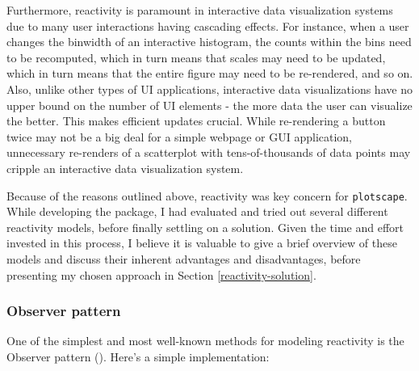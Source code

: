 \documentclass[
  openany]{book}
\theoremstyle{definition}
\theoremstyle{definition}
\theoremstyle{definition}
\theoremstyle{definition}
\theoremstyle{remark}
\begin{document}
Furthermore, reactivity is paramount in interactive data visualization systems due to many user interactions having cascading effects. For instance, when a user changes the binwidth of an interactive histogram, the counts within the bins need to be recomputed, which in turn means that scales may need to be updated, which in turn means that the entire figure may need to be re-rendered, and so on. Also, unlike other types of UI applications, interactive data visualizations have no upper bound on the number of UI elements - the more data the user can visualize the better. This makes efficient updates crucial. While re-rendering a button twice may not be a big deal for a simple webpage or GUI application, unnecessary re-renders of a scatterplot with tens-of-thousands of data points may cripple an interactive data visualization system.

Because of the reasons outlined above, reactivity was key concern for \texttt{plotscape}. While developing the package, I had evaluated and tried out several different reactivity models, before finally settling on a solution. Given the time and effort invested in this process, I believe it is valuable to give a brief overview of these models and discuss their inherent advantages and disadvantages, before presenting my chosen approach in Section \ref{reactivity-solution}.

\subsubsection{Observer pattern}\label{observer}

One of the simplest and most well-known methods for modeling reactivity is the Observer pattern (). Here's a simple implementation:
\end{document}
